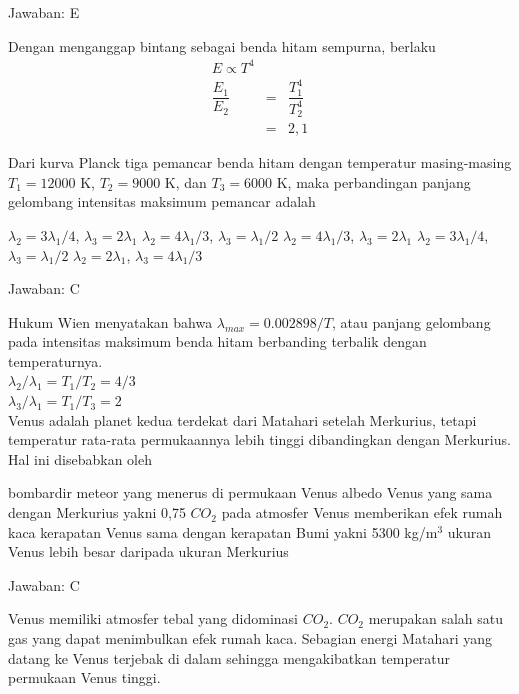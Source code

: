 \documentclass[11pt,fleqn]{exam}
\begin{document}
\begin{questions}
Jawaban: E

Dengan menganggap bintang sebagai benda hitam sempurna, berlaku
\begin{eqnarray*}
E \propto T^{4}\\
\dfrac{E_{1}}{E_{2}}&=&\dfrac{T_{1}^{4}}{T_{2}^{4}}\\
&=&2,1
\end{eqnarray*}


\question Dari kurva Planck tiga pemancar benda hitam dengan temperatur masing-masing $T_1 = 12000$ K, $T_2 = 9000$ K, dan $T_3 = 6000$ K, maka perbandingan panjang gelombang intensitas maksimum pemancar adalah
\begin{choices}
\choice $\lambda_2 = 3 \lambda_1/4$, $\lambda_3 = 2\lambda_1$
\choice $\lambda_2 = 4 \lambda_1/3$, $\lambda_3 = \lambda_1/2$
\choice $\lambda_2 = 4 \lambda_1/3$, $\lambda_3 = 2\lambda_1$
\choice $\lambda_2 = 3 \lambda_1/4$, $\lambda_3 = \lambda_1/2$
\choice $\lambda_2 = 2 \lambda_1$, $\lambda_3 = 4\lambda_1/3$
\end{choices}

Jawaban: C

Hukum Wien menyatakan bahwa $\lambda_{max} = 0.002898/T$, atau panjang gelombang pada intensitas maksimum benda hitam berbanding terbalik dengan temperaturnya.\\
$\lambda_2 / \lambda_1 = T_1 / T_2 = 4/3$ \\
$\lambda_3 / \lambda_1 = T_1 / T_3 = 2$\\


\question Venus adalah planet kedua terdekat dari Matahari setelah Merkurius, tetapi temperatur rata-rata permukaannya lebih tinggi dibandingkan dengan Merkurius. Hal ini disebabkan oleh
\begin{choices}
\choice bombardir meteor yang menerus di permukaan Venus
\choice albedo Venus yang sama dengan Merkurius yakni 0,75
\choice $CO_{2}$ pada atmosfer Venus memberikan efek rumah kaca
\choice kerapatan Venus sama dengan kerapatan Bumi yakni 5300 kg/m$^3$
\choice ukuran Venus lebih besar daripada ukuran Merkurius
\end{choices}

Jawaban: C

Venus memiliki atmosfer tebal yang didominasi $CO_2$. $CO_2$ merupakan salah satu gas yang dapat menimbulkan efek rumah kaca. Sebagian energi Matahari yang datang ke Venus terjebak di dalam sehingga mengakibatkan temperatur permukaan Venus tinggi.\\



\end{questions}
\end{document}
